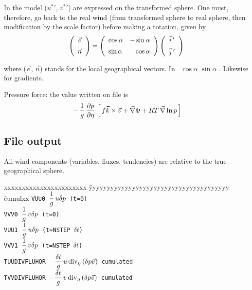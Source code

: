 In the model (${u^*}'$, ${v^*}'$) are expressed on the transformed sphere. One must, therefore, go back to the real wind (from transformed sphere to real sphere, then modification by the scale factor) before making a rotation, given by
$$ \lp \bay{c} \vec e \\[1ex] \vec n \eay \rp = \lp \bay{lr} \cos\alpha & -\sin\alpha \\[1ex] \sin\alpha 
& \cos\alpha \eay \rp \lp \bay{c} \vec i\,' \\[1ex] \vec j\,' \eay \rp $$

\noi where ($\vec e$, $\vec n$) stands for the local geographical vectors. In \ARP\
$\cos\alpha$  \qquad $\sin\alpha$ .
Likewise for gradients.

\ms
Pressure force: the value written on file is 
$$ \mb - \frac 1g \,\DerP p{\eta} \lc f\vec k \times \vec v + \grad \Phi + RT \,\grad \ln p \rd $$

\subsection*{File output}

All wind components (variables, fluxes, tendencies) are relative to the true geographical sphere.
\begin{tabbing}
xxxxxxxxxxxxxxxxxxxxxxx \= yyyyyyyyyyyyyyyyyyyyyyyyyyyyyyyyyyyyyyy \= cumulxx \kill
\tt VUU0 \> $\ds \frac 1g \, u\delta p$ (t=0) \\[1ex]
\tt VVV0 \> $\ds \frac 1g \, v\delta p$ (t=0) \\[1ex]
\tt VUU1 \> $\ds \frac 1g \, u\delta p$ (t=NSTEP $\delta t$) \\[1ex]
\tt VVV1 \> $\ds \frac 1g \, v\delta p$ (t=NSTEP $\delta t$) \\[1ex]
\tt TUUDIVFLUHOR \> $\ds -\frac{\delta t}g \,u \divi{\eta}\lp \delta p \vec v \rp$ \> cumulated \\[1ex]
\tt TVVDIVFLUHOR \> $\ds -\frac{\delta t}g \,v \divi{\eta}\lp \delta p \vec v \rp$ \> cumulated
\end{tabbing}

